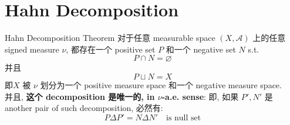 \documentclass[lang=cn,11pt]{elegantbook}
\begin{document}
\section{Hahn Decomposition}
\begin{theorem}{Hahn Decomposition Theorem}
对于任意 measurable space $(X,\mathcal{A})$ 上的任意 signed measure $\nu$, 都存在一个 positive set $P$ 和一个 negative set $N$ s.t. \[
P \cap N = \varnothing
\]
并且 \[
P \sqcup N = X
\]
即$X$ 被 $\nu$ 划分为一个 positive measure space 和一个 negative measure space. \\
并且, \textbf{这个 decomposition 是唯一的, in $\nu$-a.e. sense}: 即, 如果 $P',N'$ 是 another pair of such decomposition, 必然有: \[
P \Delta P' =  N \Delta N' \quad \text{is null set}
\]
\end{theorem}
\end{document}
